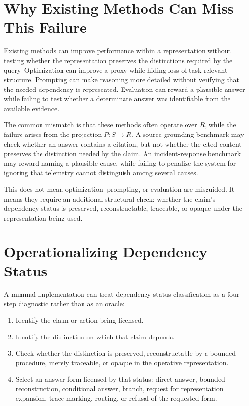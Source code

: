 \documentclass[11pt]{article}
\begin{document}
\section{Why Existing Methods Can Miss This Failure}

Existing methods can improve performance within a representation without testing whether the representation preserves the distinctions required by the query. Optimization can improve a proxy while hiding loss of task-relevant structure. Prompting can make reasoning more detailed without verifying that the needed dependency is represented. Evaluation can reward a plausible answer while failing to test whether a determinate answer was identifiable from the available evidence.

The common mismatch is that these methods often operate over $R$, while the failure arises from the projection $P:S\rightarrow R$. A source-grounding benchmark may check whether an answer contains a citation, but not whether the cited content preserves the distinction needed by the claim. An incident-response benchmark may reward naming a plausible cause, while failing to penalize the system for ignoring that telemetry cannot distinguish among several causes.

This does not mean optimization, prompting, or evaluation are misguided. It means they require an additional structural check: whether the claim's dependency status is preserved, reconstructable, traceable, or opaque under the representation being used.

\section{Operationalizing Dependency Status}

A minimal implementation can treat dependency-status classification as a four-step diagnostic rather than as an oracle:

\begin{enumerate}[leftmargin=1.5em]
    \item Identify the claim or action being licensed.
    \item Identify the distinction on which that claim depends.
    \item Check whether the distinction is preserved, reconstructable by a bounded procedure, merely traceable, or opaque in the operative representation.
    \item Select an answer form licensed by that status: direct answer, bounded reconstruction, conditional answer, branch, request for representation expansion, trace marking, routing, or refusal of the requested form.
\end{enumerate}
\end{document}
